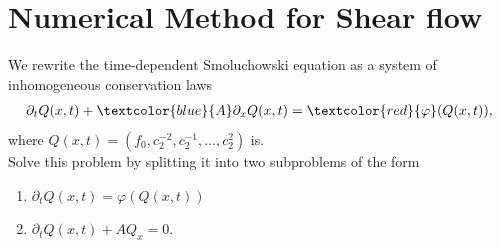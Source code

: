 \section{Numerical Method for Shear flow}
\begin{frame}
	\scriptsize
	We rewrite the time-dependent Smoluchowski equation as a system of inhomogeneous conservation laws
	\begin{align}
		\partial_t Q(x,t) + \textcolor{blue}{A}\partial_x Q(x,t) = \textcolor{red}{\varphi} (Q(x,t)),
	\end{align}
	where $Q(x,t) = (f_0, c^{-2}_2, c^{-1}_2, ..., c^2_2)$ is. \\
	\vspace{0.5cm}
	Solve this problem by splitting it into two subproblems of the form
	\begin{enumerate}
		\item $\partial_t Q(x,t)  = \varphi (Q(x,t))$
		\item $\partial_t Q(x,t) + A Q_x=0$.
	\end{enumerate}
\end{frame}

